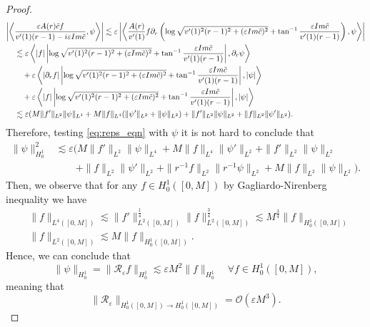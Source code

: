 \documentclass[11pt,reqno]{amsproc}
\def\eps{\varepsilon}
\def\de{{\partial}}
\def\Im{{\rm Im}}
\newcommand{\taninv}{\tan^{-1}}
\theoremstyle{definition}
\theoremstyle{definition}
\numberwithin{equation}{section}
\begin{document}
\begin{proof}
\begin{align}
    \bigg|\bigg\langle &\frac{\varepsilon A(r) \tilde c f}{v'(1)(r-1) - i \varepsilon \Im \tilde c}, \psi \bigg\rangle\bigg| \lesssim \varepsilon\left|\left\langle \frac{A(r)}{v'(1)}  f  \de_r \left(\log\sqrt{v'(1)^2(r-1)^2 + (\varepsilon \Im\tilde{c})^2} + \taninv\frac{\varepsilon \Im \tilde{c}}{v'(1)(r-1)}\right), \psi \right\rangle\right| \\
    & \lesssim \varepsilon \left\langle |f| \left|\log\sqrt{v'(1)^2(r-1)^2 + (\varepsilon \Im\tilde{c})^2} + \taninv\frac{\varepsilon \Im \tilde{c}}{v'(1)(r-1)}\right|, \de_r \psi \right\rangle \\ 
    & \quad + \varepsilon\left\langle |\de_r f| \left|\log\sqrt{v'(1)^2(r-1)^2 + (\varepsilon \Im\tilde{c})^2} + \taninv\frac{\varepsilon \Im \tilde{c}}{v'(1)(r-1)}\right|, |\psi| \right\rangle\\
    &\quad +\varepsilon\left\langle |f| \left|\log\sqrt{v'(1)^2(r-1)^2 + (\varepsilon \Im\tilde{c})^2} + \taninv\frac{\varepsilon \Im \tilde{c}}{v'(1)(r-1)}\right|, |\psi| \right\rangle\\
    & \lesssim \varepsilon (M\|f'\|_{L^2}\|\psi\|_{L^4} + M\|f\|_{L^4}(\|\psi'\|_{L^2}+\|\psi\|_{L^2}) + \|f'\|_{L^2}\|\psi\|_{L^2} + \|f\|_{L^2}\|\psi'\|_{L^2}).
\end{align}
Therefore, testing \cref{eq:reps_eqn} with $\psi$  it is not hard to conclude that 
\begin{align}
    \| \psi\|^2_{H^1_0} 
     & \lesssim \varepsilon (M\|f'\|_{L^2}\|\psi\|_{L^4} + M\|f\|_{L^4}\|\psi'\|_{L^2} + \|f'\|_{L^2}\|\psi\|_{L^2}  \\ & \qquad +\|f\|_{L^2}\|\psi'\|_{L^2}+ \| r^{-1} f\|_{L^2} \| r^{-1} \psi\|_{L^2} +  M \|f\|_{L^2}\|\psi\|_{L^2}) .
\end{align}
Then, we observe that for any $f\in H^1_0([0,M])$ by Gagliardo-Nirenberg inequality we have
\begin{align}
    &\| f\|_{L^4([0,M])}\lesssim  \|f'\|_{L^2([0,M])}^\frac14\|f\|_{L^2([0,M])}^\frac34\lesssim M^\frac34 \|f\|_{H^1_0([0,M])} \label{eq:L4M}\\
    &\| f\|_{L^2([0,M])} \lesssim M\|f\|_{H^1_0([0,M])}\label{eq:L2M}.
\end{align}
Hence, we can conclude that
\begin{equation}
\|\psi\|_{H^1_0} = \| \mathcal R_{\varepsilon} f \|_{H^1_0} \lesssim \eps M^2 \|f\|_{H^1_0}\quad \forall f \in H^1_0([0,M]), 
\end{equation}
meaning that 
\begin{equation}
\label{eq:Reps_est}
\| \mathcal R_{\varepsilon} \|_{H^1_0([0,M]) \rightarrow H^1_0([0,M])} = \mathcal{O}(\varepsilon M^3). 
\end{equation}


\end{proof}
\end{document}

